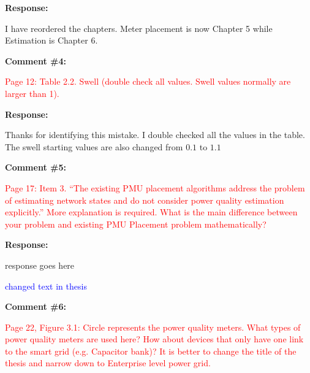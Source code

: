 \documentclass[journal]{IEEEtran}
\begin{document}
\vspace{10pt}
\textbf{Response:}
\begin{adjustwidth}{2.5em}{0pt}
I have reordered the chapters. Meter placement is now Chapter 5 while Estimation is Chapter 6.
\end{adjustwidth}



\vspace{20pt}
\textbf{Comment \#4:}
\begin{adjustwidth}{2.5em}{0pt}
\singlespacing \vspace{-10pt}
\textcolor{red}{Page 12: Table 2.2. Swell (double check all values. Swell values normally are larger than 1).}
\end{adjustwidth}

\vspace{10pt}
\textbf{Response:}
\begin{adjustwidth}{2.5em}{0pt}
Thanks for identifying this mistake. I double checked all the values in the table. The swell starting values are also changed from $0.1$ to $1.1$
\end{adjustwidth}



\vspace{30pt}
\textbf{Comment \#5:}
\begin{adjustwidth}{2.5em}{0pt}
\singlespacing \vspace{-10pt}
\textcolor{red}{Page 17: Item 3. “The existing PMU placement algorithms address the problem of estimating network states and do not consider power quality estimation explicitly.” More explanation is required. What is the main difference between your problem and existing PMU Placement problem mathematically?}
\end{adjustwidth}

\vspace{10pt}
\textbf{Response:}
\begin{adjustwidth}{2.5em}{0pt}
response goes here

\vspace{10pt}
\noindent\textcolor{blue}{changed text in thesis}
\end{adjustwidth}



\vspace{30pt}
\textbf{Comment \#6:}
\begin{adjustwidth}{2.5em}{0pt}
\singlespacing \vspace{-10pt}
\textcolor{red}{Page 22, Figure 3.1: Circle represents the power quality meters. What types of power quality meters are used here? How about devices that only have one link to the smart grid (e.g. Capacitor bank)? It is better to change the title of the thesis and narrow down to Enterprise level power grid.}
\end{adjustwidth}
\end{document}
